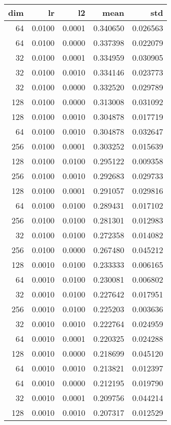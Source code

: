\begin{tabular}{rrrrr}
\toprule
 dim &      lr &      l2 &      mean &       std \\
\midrule
  64 &  0.0100 &  0.0001 &  0.340650 &  0.026563 \\
  64 &  0.0100 &  0.0000 &  0.337398 &  0.022079 \\
  32 &  0.0100 &  0.0001 &  0.334959 &  0.030905 \\
  32 &  0.0100 &  0.0010 &  0.334146 &  0.023773 \\
  32 &  0.0100 &  0.0000 &  0.332520 &  0.029789 \\
 128 &  0.0100 &  0.0000 &  0.313008 &  0.031092 \\
 128 &  0.0100 &  0.0010 &  0.304878 &  0.017719 \\
  64 &  0.0100 &  0.0010 &  0.304878 &  0.032647 \\
 256 &  0.0100 &  0.0001 &  0.303252 &  0.015639 \\
 128 &  0.0100 &  0.0100 &  0.295122 &  0.009358 \\
 256 &  0.0100 &  0.0010 &  0.292683 &  0.029733 \\
 128 &  0.0100 &  0.0001 &  0.291057 &  0.029816 \\
  64 &  0.0100 &  0.0100 &  0.289431 &  0.017102 \\
 256 &  0.0100 &  0.0100 &  0.281301 &  0.012983 \\
  32 &  0.0100 &  0.0100 &  0.272358 &  0.014082 \\
 256 &  0.0100 &  0.0000 &  0.267480 &  0.045212 \\
 128 &  0.0010 &  0.0100 &  0.233333 &  0.006165 \\
  64 &  0.0010 &  0.0100 &  0.230081 &  0.006802 \\
  32 &  0.0010 &  0.0100 &  0.227642 &  0.017951 \\
 256 &  0.0010 &  0.0100 &  0.225203 &  0.003636 \\
  32 &  0.0010 &  0.0010 &  0.222764 &  0.024959 \\
  64 &  0.0010 &  0.0001 &  0.220325 &  0.024288 \\
 128 &  0.0010 &  0.0000 &  0.218699 &  0.045120 \\
  64 &  0.0010 &  0.0010 &  0.213821 &  0.012397 \\
  64 &  0.0010 &  0.0000 &  0.212195 &  0.019790 \\
  32 &  0.0010 &  0.0001 &  0.209756 &  0.044214 \\
 128 &  0.0010 &  0.0010 &  0.207317 &  0.012529 \\

\end{tabular}
